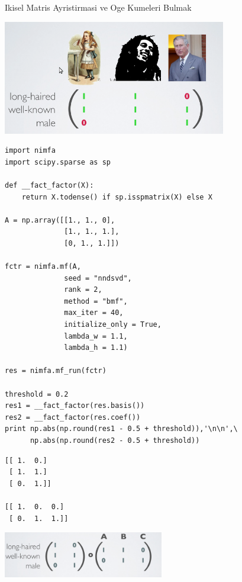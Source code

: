 \documentclass[12pt,fleqn]{article}\usepackage{../common}
\begin{document}
Ikisel Matris Ayristirmasi ve Oge Kumeleri Bulmak

\includegraphics[height=5cm]{abc.png}

\begin{verbatim}
import nimfa
import scipy.sparse as sp

def __fact_factor(X):
    return X.todense() if sp.isspmatrix(X) else X

A = np.array([[1., 1., 0],
              [1., 1., 1.],
              [0, 1., 1.]])

fctr = nimfa.mf(A,
              seed = "nndsvd", 
              rank = 2, 
              method = "bmf", 
              max_iter = 40, 
              initialize_only = True,
              lambda_w = 1.1,
              lambda_h = 1.1)

res = nimfa.mf_run(fctr)

threshold = 0.2
res1 = __fact_factor(res.basis())
res2 = __fact_factor(res.coef())
print np.abs(np.round(res1 - 0.5 + threshold)),'\n\n',\
      np.abs(np.round(res2 - 0.5 + threshold))
\end{verbatim}

\begin{verbatim}
[[ 1.  0.]
 [ 1.  1.]
 [ 0.  1.]] 

[[ 1.  0.  0.]
 [ 0.  1.  1.]]
\end{verbatim}

\includegraphics[height=2cm]{abc_res.png}
\end{document}
